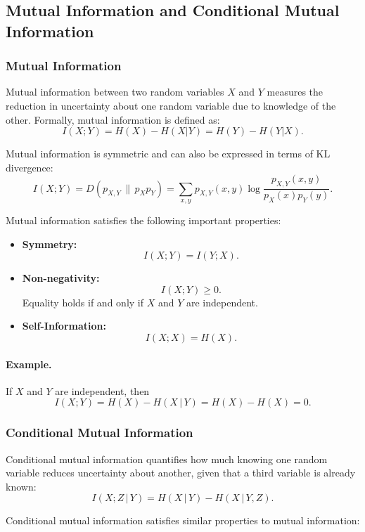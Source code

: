 \subsection{Mutual Information and Conditional Mutual Information}

\subsubsection{Mutual Information}
Mutual information between two random variables \( X \) and \( Y \) measures the reduction in uncertainty about one random variable due to knowledge of the other. Formally, mutual information is defined as:
\[
I(X;Y) = H(X) - H(X|Y) = H(Y) - H(Y|X).
\]

Mutual information is symmetric and can also be expressed in terms of KL divergence:
\[
I(X;Y) = D(p_{X,Y}\,\|\,p_X p_Y) = \sum_{x,y} p_{X,Y}(x,y)\log\frac{p_{X,Y}(x,y)}{p_X(x)p_Y(y)}.
\]

Mutual information satisfies the following important properties:

\begin{itemize}
    \item \textbf{Symmetry:} 
    \[
    I(X;Y) = I(Y;X).
    \]

    \item \textbf{Non-negativity:} 
    \[
    I(X;Y)\ge 0.
    \]
    Equality holds if and only if \(X\) and \(Y\) are independent.

    \item \textbf{Self-Information:} 
    \[
    I(X;X) = H(X).
    \]
\end{itemize}

\paragraph{Example.} If \(X\) and \(Y\) are independent, then 
\[
I(X;Y)=H(X)-H(X\,|\,Y)=H(X)-H(X)=0.
\]

\subsubsection{Conditional Mutual Information}

Conditional mutual information quantifies how much knowing one random variable reduces uncertainty about another, given that a third variable is already known:
\[
I(X;Z\,|\,Y)=H(X\,|\,Y)-H(X\,|\,Y,Z).
\]

Conditional mutual information satisfies similar properties to mutual information:

